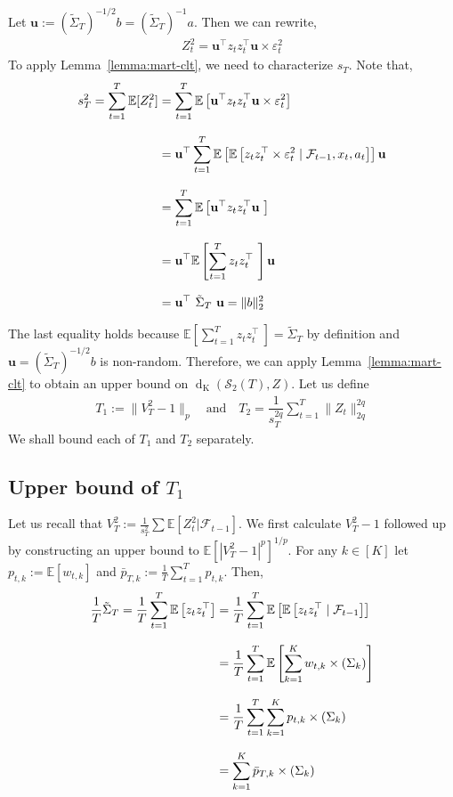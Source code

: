 \documentclass[11pt,letterpaper]{article}
\newcommand{\Exs}{\mathbb{E}}
\newcommand{\z}{z}
\newcommand{\dist}{\operatorname{d}_{\operatorname{K}}}
\newcommand{\PT}{\tilde{\Sigma}_T}
\newcommand{\stato}{\mathcal{S}_2(T)}
\newcommand{\lvec}{\textbf{u}}
\theoremstyle{plain}
\theoremstyle{definition}  %
\begin{document}
\noindent Let $\lvec := \left(\PT \right)^{-1/2}b = \left(\PT \right)^{-1}a$. Then we can rewrite,
\begin{align}
    Z^2_t  =  \lvec^{\top} \z_t \z^{\top}_t \lvec \times \varepsilon^2_t
\end{align}
\noindent To apply Lemma~\ref{lemma:mart-clt}, we need to characterize $s_T$. Note that,
\begin{align}\label{eqn:sT-equival}
\notag
    s^2_T 
     = \sum^T_{t=1} \Exs[Z^2_t]
    & = \sum^T_{t=1} \Exs \left[\lvec^{\top} \z_t \z^{\top}_t \lvec \times \varepsilon^2_t \right]\\[8pt] \notag
    & =   \lvec^{\top}  \sum^T_{t=1} \Exs \left[ \Exs \left[ \z_t \z^{\top}_t \times \varepsilon^2_t \mid \mathcal{F}_{t-1},x_t,a_t\right] \right] \lvec \\[8pt] \notag
     & =   \sum^T_{t=1} \Exs \left[\lvec^{\top} \z_t \z^{\top}_t \lvec \ \right]\\[8pt]\notag
     & =   \lvec^{\top} \Exs \left[ \sum^T_{t=1} \z_t \z^{\top}_t  \ \right]\lvec \\[8pt]
     & = \lvec^{\top} \ \PT \ \lvec = \| b\|_2^2
\end{align}

\noindent The last equality holds because $\Exs \left[ \sum^T_{t=1} \z_t \z^{\top}_t  \ \right] = \PT $ by definition and $\lvec =  \left(\PT \right)^{-1/2}b $ is non-random. Therefore, we can apply Lemma~\ref{lemma:mart-clt}  to obtain an upper bound on $\dist(\stato,Z)$. Let us define
\begin{align}\label{defn:TT}
    T_1 := \|V^2_T-1 \|_p \quad \text{and} \quad T_2 = \dfrac{1}{s^{2q}_T}\sum^T_{t=1} \| Z_t\|^{2q}_{2q}
\end{align}
\noindent We shall bound each of $T_1$ and $T_2$ separately.
\subsection*{Upper bound of $T_1$}

Let us recall that $V^2_T := \frac{1}{s^2_T} \sum \Exs[Z^2_t|\mathcal{F}_{t-1}]$. We first calculate $V_T^2-1$ followed up by constructing an upper bound to $\Exs[|V_T^2-1|^p]^{1/p}$. For any $k\in [K]$ let $p_{t,k} := \Exs[w_{t,k}]$ and $\bar{p}_{T,k} := \frac{1}{T} \sum^T_{t=1} p_{t,k}$. Then,
\begin{align}\label{eqn:PT-val}
\notag
    \frac{1}{T} \PT =  
    \frac{1}{T} \sum^T_{t=1} \Exs \left[ \z_t \z^{\top}_t  \right]
    & = \frac{1}{T} \sum^T_{t=1} \Exs \left[ \Exs \left[   \z_t \z^{\top}_t \mid \mathcal{F}_{t-1} \right] \right]\\[8pt]\notag
    & = \frac{1}{T} \sum^T_{t=1} \Exs \left[ \sum^K_{k=1}w_{t,k} \times(\Sigma_k) \right]\\[8pt]
    \notag
    & = \frac{1}{T} \sum^T_{t=1} \sum^K_{k=1}p_{t,k} \times (\Sigma_k) \\[8pt]
    & = \sum^K_{k=1} \bar{p}_{T,k} \times (\Sigma_k)
\end{align}
\end{document}
